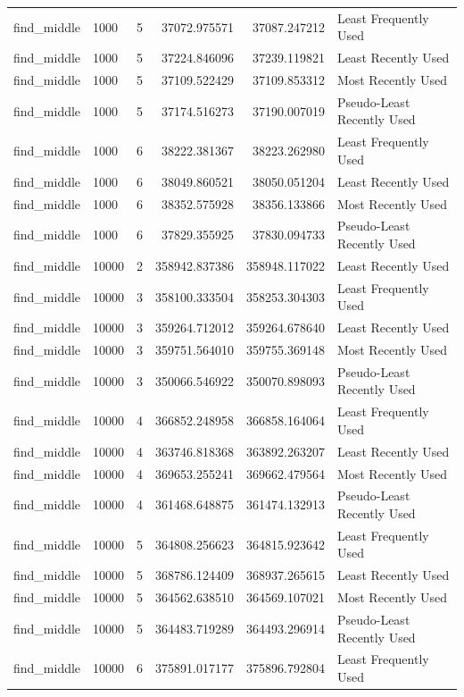 \begin{tabular}{llrrrl}
find_middle & 1000 & 5 & 37072.975571 & 37087.247212 & Least Frequently Used \\
find_middle & 1000 & 5 & 37224.846096 & 37239.119821 & Least Recently Used \\
find_middle & 1000 & 5 & 37109.522429 & 37109.853312 & Most Recently Used \\
find_middle & 1000 & 5 & 37174.516273 & 37190.007019 & Pseudo-Least Recently Used \\
find_middle & 1000 & 6 & 38222.381367 & 38223.262980 & Least Frequently Used \\
find_middle & 1000 & 6 & 38049.860521 & 38050.051204 & Least Recently Used \\
find_middle & 1000 & 6 & 38352.575928 & 38356.133866 & Most Recently Used \\
find_middle & 1000 & 6 & 37829.355925 & 37830.094733 & Pseudo-Least Recently Used \\
find_middle & 10000 & 2 & 358942.837386 & 358948.117022 & Least Recently Used \\
find_middle & 10000 & 3 & 358100.333504 & 358253.304303 & Least Frequently Used \\
find_middle & 10000 & 3 & 359264.712012 & 359264.678640 & Least Recently Used \\
find_middle & 10000 & 3 & 359751.564010 & 359755.369148 & Most Recently Used \\
find_middle & 10000 & 3 & 350066.546922 & 350070.898093 & Pseudo-Least Recently Used \\
find_middle & 10000 & 4 & 366852.248958 & 366858.164064 & Least Frequently Used \\
find_middle & 10000 & 4 & 363746.818368 & 363892.263207 & Least Recently Used \\
find_middle & 10000 & 4 & 369653.255241 & 369662.479564 & Most Recently Used \\
find_middle & 10000 & 4 & 361468.648875 & 361474.132913 & Pseudo-Least Recently Used \\
find_middle & 10000 & 5 & 364808.256623 & 364815.923642 & Least Frequently Used \\
find_middle & 10000 & 5 & 368786.124409 & 368937.265615 & Least Recently Used \\
find_middle & 10000 & 5 & 364562.638510 & 364569.107021 & Most Recently Used \\
find_middle & 10000 & 5 & 364483.719289 & 364493.296914 & Pseudo-Least Recently Used \\
find_middle & 10000 & 6 & 375891.017177 & 375896.792804 & Least Frequently Used \\

\end{tabular}
